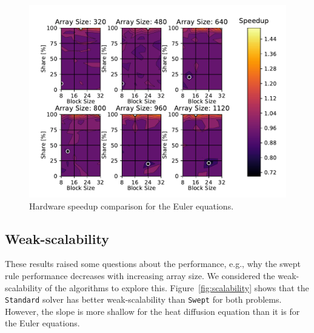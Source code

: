 \documentclass[journal,article,submit,moreauthors,pdftex]{Definitions/mdpi}
\def\Swept{\texttt{Swept}}
\def\Standard{\texttt{Standard}}
\newcommand\fs{1}
\begin{document}
\begin{figure}
    \widefigure
    \begin{center}
        \includegraphics[scale=\fs, trim={0.75cm 0.4cm 0.8cm 0.7cm},clip]{figs/hardwareSpeedUpeuler.pdf}
        \caption{Hardware speedup comparison for the Euler equations.}
        \label{fig:eulerHardwareComp}
    \end{center}
\end{figure}
\begin{paracol}{2}
\linenumbers
\switchcolumn

\subsection{Weak-scalability}
These results raised some questions about the performance, e.g., why the swept rule performance decreases with increasing array size. We considered the weak-scalability of the algorithms to explore this. Figure~\ref{fig:scalability} shows that the \Standard{} solver has better weak-scalability than \Swept{} for both problems. However, the slope is more shallow for the heat diffusion equation than it is for the Euler equations. 
\end{paracol}
\end{document}
